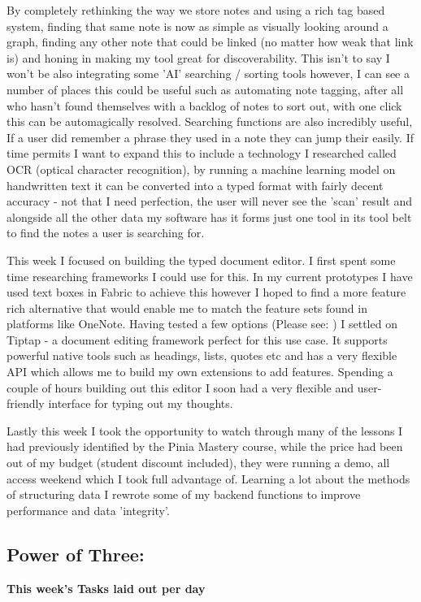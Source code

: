 By completely rethinking the way we store notes and using a rich tag based system, finding that same note is now as simple as visually looking around a graph, finding any other note that could be linked (no matter how weak that link is) and honing in making my tool great for discoverability. This isn't to say I won't be also integrating some 'AI' searching / sorting tools however, I can see a number of places this could be useful such as automating note tagging, after all who hasn't found themselves with a backlog of notes to sort out, with one click this can be automagically resolved. Searching functions are also incredibly useful, If a user did remember a phrase they used in a note they can jump their easily. If time permits I want to expand this to include a technology I researched called OCR (optical character recognition), by running a machine learning model on handwritten text it can be converted into a typed format with fairly decent accuracy - not that I need perfection, the user will never see the 'scan' result and alongside all the other data my software has it forms just one tool in its tool belt to find the notes a user is searching for. 

This week I focused on building the typed document editor. I first spent some time researching frameworks I could use for this. In my current prototypes I have used text boxes in Fabric to achieve this however I hoped to find a more feature rich alternative that would enable me to match the feature sets found in platforms like OneNote. Having tested a few options (Please see: ) I settled on Tiptap - a document editing framework perfect for this use case. It supports powerful native tools such as headings, lists, quotes etc and has a very flexible API which allows me to build my own extensions to add features. Spending a couple of hours building out this editor I soon had a very flexible and user-friendly interface for typing out my thoughts.

Lastly this week I took the opportunity to watch through many of the lessons I had previously identified by the Pinia Mastery course, while the price had been out of my budget (student discount included), they were running a demo, all access weekend which I took full advantage of. Learning a lot about the methods of structuring data I rewrote some of my backend functions to improve performance and data 'integrity'. 


\subsection*{Power of Three:}
\textbf{This week's Tasks laid out per day}

